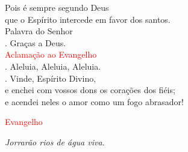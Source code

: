 \documentclass{book}
\begin{document}
\begin{flushleft}
    Pois é sempre segundo Deus \\
    que o Espírito intercede em favor dos santos.
    \vspace{0.1cm} \\
    Palavra do Senhor \\
    {\color{red} \Rbar.} Graças a Deus.
    \vspace{0.2cm} \\
    \textcolor{red}{Aclamação ao Evangelho}
    \vspace{0.1cm} \\
    {\color{red} \Rbar.} Aleluia, Aleluia, Aleluia. \\
    {\color{red} \Vbar.} Vinde, Espírito Divino, \\
    e enchei com vossos dons os corações dos fiéis; \\
    e acendei neles o amor como um fogo abrasador!

\end{flushleft}

\begin{center}

    \textcolor{red}{Evangelho}

\end{center}

\begin{flushright}
    \textit{Jorrarão rios de água viva.}
\end{flushright}
\end{document}
